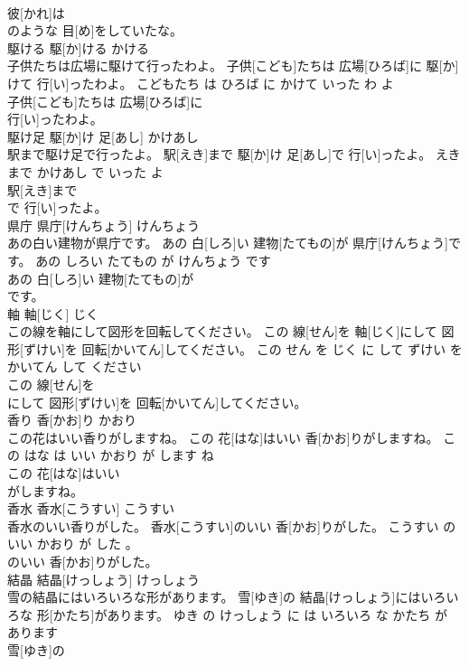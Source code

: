 \documentclass[8pt]{extreport}
\begin{document}
\begin{CJK}{UTF8}{min}
\\	彼[かれ]は
\\	のような 目[め]をしていたな。			
\\	駆ける	駆[か]ける	かける	
\\	子供たちは広場に駆けて行ったわよ。	子供[こども]たちは 広場[ひろば]に 駆[か]けて 行[い]ったわよ。	こどもたち は ひろば に かけて いった わ よ	
\\	子供[こども]たちは 広場[ひろば]に
\\	行[い]ったわよ。			
\\	駆け足	駆[か]け 足[あし]	かけあし	
\\	駅まで駆け足で行ったよ。	駅[えき]まで 駆[か]け 足[あし]で 行[い]ったよ。	えき まで かけあし で いった よ	
\\	駅[えき]まで
\\	で 行[い]ったよ。			
\\	県庁	県庁[けんちょう]	けんちょう	
\\	あの白い建物が県庁です。	あの 白[しろ]い 建物[たてもの]が 県庁[けんちょう]です。	あの しろい たてもの が けんちょう です	
\\	あの 白[しろ]い 建物[たてもの]が
\\	です。			
\\	軸	軸[じく]	じく	
\\	この線を軸にして図形を回転してください。	この 線[せん]を 軸[じく]にして 図形[ずけい]を 回転[かいてん]してください。	この せん を じく に して ずけい を かいてん して ください	
\\	この 線[せん]を
\\	にして 図形[ずけい]を 回転[かいてん]してください。			
\\	香り	香[かお]り	かおり	
\\	この花はいい香りがしますね。	この 花[はな]はいい 香[かお]りがしますね。	この はな は いい かおり が します ね	
\\	この 花[はな]はいい
\\	がしますね。			
\\	香水	香水[こうすい]	こうすい	
\\	香水のいい香りがした。	香水[こうすい]のいい 香[かお]りがした。	こうすい の いい かおり が した 。	
\\	のいい 香[かお]りがした。			
\\	結晶	結晶[けっしょう]	けっしょう	
\\	雪の結晶にはいろいろな形があります。	雪[ゆき]の 結晶[けっしょう]にはいろいろな 形[かたち]があります。	ゆき の けっしょう に は いろいろ な かたち が あります	
\\	雪[ゆき]の

\end{CJK}
\end{document}

